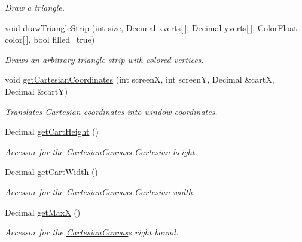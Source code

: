 \begin{DoxyCompactItemize}
\begin{DoxyCompactList}\small\item\em Draw a triangle. \end{DoxyCompactList}\item 
void \hyperlink{classtsgl_1_1_cartesian_canvas_a924f6148489c634ec4d47970e498a26a}{draw\+Triangle\+Strip} (int size, Decimal xverts\mbox{[}$\,$\mbox{]}, Decimal yverts\mbox{[}$\,$\mbox{]}, \hyperlink{structtsgl_1_1_color_float}{Color\+Float} color\mbox{[}$\,$\mbox{]}, bool filled=true)
\begin{DoxyCompactList}\small\item\em Draws an arbitrary triangle strip with colored vertices. \end{DoxyCompactList}\item 
void \hyperlink{classtsgl_1_1_cartesian_canvas_a736935074bb6d90bcc0c7af2edd8a4aa}{get\+Cartesian\+Coordinates} (int screen\+X, int screen\+Y, Decimal \&cart\+X, Decimal \&cart\+Y)
\begin{DoxyCompactList}\small\item\em Translates Cartesian coordinates into window coordinates. \end{DoxyCompactList}\item 
Decimal \hyperlink{classtsgl_1_1_cartesian_canvas_a66657636eaf20ff465898d3f932063ce}{get\+Cart\+Height} ()
\begin{DoxyCompactList}\small\item\em Accessor for the \hyperlink{classtsgl_1_1_cartesian_canvas}{Cartesian\+Canvas}\textquotesingle{}s Cartesian height. \end{DoxyCompactList}\item 
Decimal \hyperlink{classtsgl_1_1_cartesian_canvas_a829a97323261515097b7589bc96c109c}{get\+Cart\+Width} ()
\begin{DoxyCompactList}\small\item\em Accessor for the \hyperlink{classtsgl_1_1_cartesian_canvas}{Cartesian\+Canvas}\textquotesingle{}s Cartesian width. \end{DoxyCompactList}\item 
Decimal \hyperlink{classtsgl_1_1_cartesian_canvas_ae3cbac386f78ecff082b8c4cbd9081ed}{get\+Max\+X} ()
\begin{DoxyCompactList}\small\item\em Accessor for the \hyperlink{classtsgl_1_1_cartesian_canvas}{Cartesian\+Canvas}\textquotesingle{}s right bound. \end{DoxyCompactList}\item 

\end{DoxyCompactItemize}
